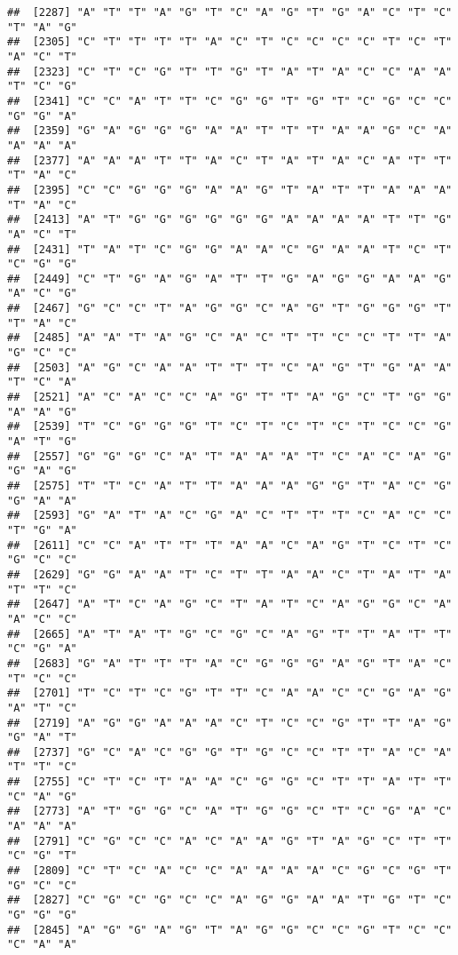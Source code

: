 \documentclass[
]{article}
\begin{document}
\begin{verbatim}
##  [2287] "A" "T" "T" "A" "G" "T" "C" "A" "G" "T" "G" "A" "C" "T" "C" "T" "A" "G"
##  [2305] "C" "T" "T" "T" "T" "A" "C" "T" "C" "C" "C" "C" "T" "C" "T" "A" "C" "T"
##  [2323] "C" "T" "C" "G" "T" "T" "G" "T" "A" "T" "A" "C" "C" "A" "A" "T" "C" "G"
##  [2341] "C" "C" "A" "T" "T" "C" "G" "G" "T" "G" "T" "C" "G" "C" "C" "G" "G" "A"
##  [2359] "G" "A" "G" "G" "G" "A" "A" "T" "T" "T" "A" "A" "G" "C" "A" "A" "A" "A"
##  [2377] "A" "A" "A" "T" "T" "A" "C" "T" "A" "T" "A" "C" "A" "T" "T" "T" "A" "C"
##  [2395] "C" "C" "G" "G" "G" "A" "A" "G" "T" "A" "T" "T" "A" "A" "A" "T" "A" "C"
##  [2413] "A" "T" "G" "G" "G" "G" "G" "G" "A" "A" "A" "A" "T" "T" "G" "A" "C" "T"
##  [2431] "T" "A" "T" "C" "G" "G" "A" "A" "C" "G" "A" "A" "T" "C" "T" "C" "G" "G"
##  [2449] "C" "T" "G" "A" "G" "A" "T" "T" "G" "A" "G" "G" "A" "A" "G" "A" "C" "G"
##  [2467] "G" "C" "C" "T" "A" "G" "G" "C" "A" "G" "T" "G" "G" "G" "T" "T" "A" "C"
##  [2485] "A" "A" "T" "A" "G" "C" "A" "C" "T" "T" "C" "C" "T" "T" "A" "G" "C" "C"
##  [2503] "A" "G" "C" "A" "A" "T" "T" "T" "C" "A" "G" "T" "G" "A" "A" "T" "C" "A"
##  [2521] "A" "C" "A" "C" "C" "A" "G" "T" "T" "A" "G" "C" "T" "G" "G" "A" "A" "G"
##  [2539] "T" "C" "G" "G" "G" "T" "C" "T" "C" "T" "C" "T" "C" "C" "G" "A" "T" "G"
##  [2557] "G" "G" "G" "C" "A" "T" "A" "A" "A" "T" "C" "A" "C" "A" "G" "G" "A" "G"
##  [2575] "T" "T" "C" "A" "T" "T" "A" "A" "A" "G" "G" "T" "A" "C" "G" "G" "A" "A"
##  [2593] "G" "A" "T" "A" "C" "G" "A" "C" "T" "T" "T" "C" "A" "C" "C" "T" "G" "A"
##  [2611] "C" "C" "A" "T" "T" "T" "A" "A" "C" "A" "G" "T" "C" "T" "C" "G" "C" "C"
##  [2629] "G" "G" "A" "A" "T" "C" "T" "T" "A" "A" "C" "T" "A" "T" "A" "T" "T" "C"
##  [2647] "A" "T" "C" "A" "G" "C" "T" "A" "T" "C" "A" "G" "G" "C" "A" "A" "C" "C"
##  [2665] "A" "T" "A" "T" "G" "C" "G" "C" "A" "G" "T" "T" "A" "T" "T" "C" "G" "A"
##  [2683] "G" "A" "T" "T" "T" "A" "C" "G" "G" "G" "A" "G" "T" "A" "C" "T" "C" "C"
##  [2701] "T" "C" "T" "C" "G" "T" "T" "C" "A" "A" "C" "C" "G" "A" "G" "A" "T" "C"
##  [2719] "A" "G" "G" "A" "A" "A" "C" "T" "C" "C" "G" "T" "T" "A" "G" "G" "A" "T"
##  [2737] "G" "C" "A" "C" "G" "G" "T" "G" "C" "C" "T" "T" "A" "C" "A" "T" "T" "C"
##  [2755] "C" "T" "C" "T" "A" "A" "C" "G" "G" "C" "T" "T" "A" "T" "T" "C" "A" "G"
##  [2773] "A" "T" "G" "G" "C" "A" "T" "G" "G" "C" "T" "C" "G" "A" "C" "A" "A" "A"
##  [2791] "C" "G" "C" "C" "A" "C" "A" "A" "G" "T" "A" "G" "C" "T" "T" "C" "G" "T"
##  [2809] "C" "T" "C" "A" "C" "C" "A" "A" "A" "A" "C" "G" "C" "G" "T" "G" "C" "C"
##  [2827] "C" "G" "C" "G" "C" "C" "A" "G" "G" "A" "A" "T" "G" "T" "C" "G" "G" "G"
##  [2845] "A" "G" "G" "A" "G" "T" "A" "G" "G" "C" "C" "G" "T" "C" "C" "C" "A" "A"

\end{verbatim}
\end{document}
